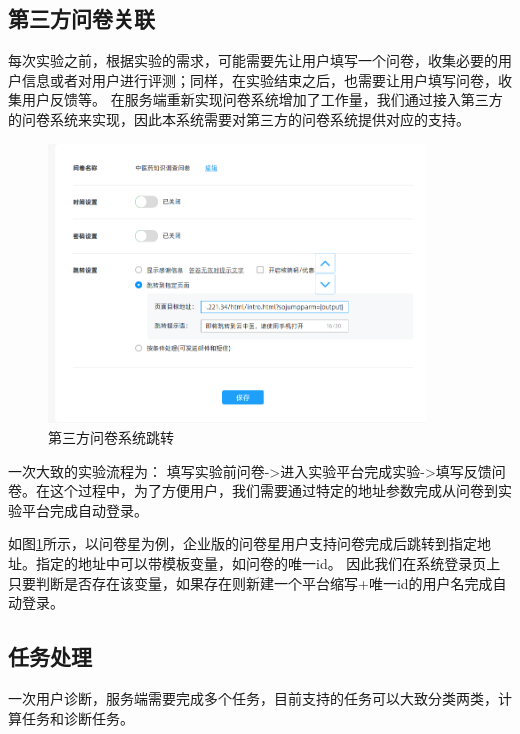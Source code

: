 \subsection{第三方问卷关联}
每次实验之前，根据实验的需求，可能需要先让用户填写一个问卷，收集必要的用户信息或者对用户进行评测；同样，在实验结束之后，也需要让用户填写问卷，收集用户反馈等。
在服务端重新实现问卷系统增加了工作量，我们通过接入第三方的问卷系统来实现，因此本系统需要对第三方的问卷系统提供对应的支持。


\begin{figure}[h]
    \centering
    \includegraphics[width=10cm]{images/wjx1.png}
    \caption{第三方问卷系统跳转}
    \label{fig:wjx-ssojump}
\end{figure}

一次大致的实验流程为： 填写实验前问卷->进入实验平台完成实验->填写反馈问卷。在这个过程中，为了方便用户，我们需要通过特定的地址参数完成从问卷到实验平台完成自动登录。

如图\ref{fig:wjx-ssojump}所示，以问卷星为例，企业版的问卷星用户支持问卷完成后跳转到指定地址。指定的地址中可以带模板变量，如问卷的唯一id。
因此我们在系统登录页上只要判断是否存在该变量，如果存在则新建一个平台缩写+唯一id的用户名完成自动登录。


\subsection{任务处理}
一次用户诊断，服务端需要完成多个任务，目前支持的任务可以大致分类两类，计算任务和诊断任务。


